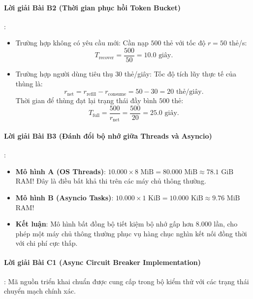 \paragraph{Lời giải Bài B2 (Thời gian phục hồi Token Bucket)}:
\begin{itemize}
  \item[a)] Trường hợp không có yêu cầu mới: Cần nạp $500$ thẻ với tốc độ $r = 50$ thẻ/s:
  \begin{equation*}
  T_{\text{recover}} = \frac{500}{50} = 10.0\text{ giây}.
  \end{equation*}
  \item[b)] Trường hợp người dùng tiêu thụ $30$ thẻ/giây: Tốc độ tích lũy thực tế của thùng là:
  \begin{equation*}
  r_{\text{net}} = r_{\text{refill}} - r_{\text{consume}} = 50 - 30 = 20\text{ thẻ/giây}.
  \end{equation*}
  Thời gian để thùng đạt lại trạng thái đầy bình $500$ thẻ:
  \begin{equation*}
  T_{\text{full}} = \frac{500}{r_{\text{net}}} = \frac{500}{20} = 25.0\text{ giây}.
  \end{equation*}
\end{itemize}

\paragraph{Lời giải Bài B3 (Đánh đổi bộ nhớ giữa Threads và Asyncio)}:
\begin{itemize}
  \item \textbf{Mô hình A (OS Threads)}: $10.000 \times 8\text{ MiB} = 80.000\text{ MiB} \approx 78.1\text{ GiB}$ RAM! Đây là điều bất khả thi trên các máy chủ thông thường.
  \item \textbf{Mô hình B (Asyncio Tasks)}: $10.000 \times 1\text{ KiB} = 10.000\text{ KiB} \approx 9.76\text{ MiB}$ RAM!
  \item \textbf{Kết luận}: Mô hình bất đồng bộ tiết kiệm bộ nhớ gấp hơn $8.000$ lần, cho phép một máy chủ thông thường phục vụ hàng chục nghìn kết nối đồng thời với chi phí cực thấp.
\end{itemize}

\paragraph{Lời giải Bài C1 (Async Circuit Breaker Implementation)}:
Mã nguồn triển khai chuẩn được cung cấp trong bộ kiểm thử  với các trạng thái chuyển mạch chính xác.

